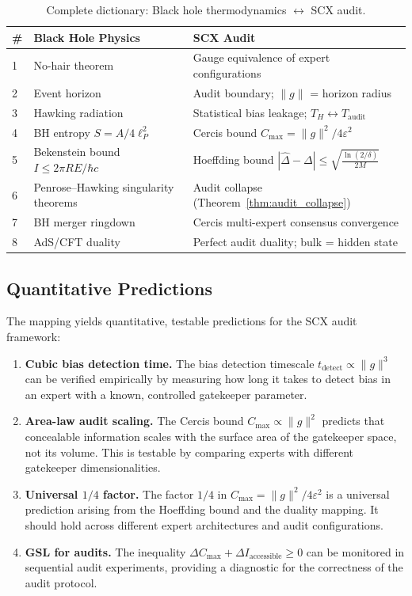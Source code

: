\documentclass[12pt,a4paper]{article}
\theoremstyle{remark}
\newcommand{\SCX}{\textsf{SCX}}
\newcommand{\Cercis}{\textsf{Cercis}}
\begin{document}
\begin{table}[H]
\centering
\caption{Complete dictionary: Black hole thermodynamics $\leftrightarrow$ SCX audit.}
\label{tab:mappings}
\begin{tabular}{@{}lll@{}}
\toprule
\textbf{\#} & \textbf{Black Hole Physics} & \textbf{SCX Audit} \\
\midrule
1 & No-hair theorem & Gauge equivalence of expert configurations \\
2 & Event horizon & Audit boundary; $\|g\|$ = horizon radius \\
3 & Hawking radiation & Statistical bias leakage; $T_H \leftrightarrow T_{\text{audit}}$ \\
4 & BH entropy $S = A/4\ell_P^2$ & Cercis bound $C_{\max} = \|g\|^2/4\varepsilon^2$ \\
5 & Bekenstein bound $I \leq 2\pi RE/\hbar c$ & Hoeffding bound $|\hat{\Delta} - \Delta| \leq \sqrt{\frac{\ln(2/\delta)}{2M}}$ \\
6 & Penrose--Hawking singularity theorems & Audit collapse (Theorem~\ref{thm:audit_collapse}) \\
7 & BH merger ringdown & \Cercis{} multi-expert consensus convergence \\
8 & AdS/CFT duality & Perfect audit duality; bulk = hidden state \\
\bottomrule
\end{tabular}
\end{table}

\subsection{Quantitative Predictions}

The mapping yields quantitative, testable predictions for the \SCX{} audit framework:

\begin{enumerate}[leftmargin=*, label=(\arabic*)]
  \item \textbf{Cubic bias detection time.} The bias detection timescale $t_{\text{detect}} \propto \|g\|^3$ can be verified empirically by measuring how long it takes to detect bias in an expert with a known, controlled gatekeeper parameter.
  \item \textbf{Area-law audit scaling.} The \Cercis{} bound $C_{\max} \propto \|g\|^2$ predicts that concealable information scales with the surface area of the gatekeeper space, not its volume. This is testable by comparing experts with different gatekeeper dimensionalities.
  \item \textbf{Universal $1/4$ factor.} The factor $1/4$ in $C_{\max} = \|g\|^2/4\varepsilon^2$ is a universal prediction arising from the Hoeffding bound and the duality mapping. It should hold across different expert architectures and audit configurations.
  \item \textbf{GSL for audits.} The inequality $\Delta C_{\max} + \Delta I_{\text{accessible}} \geq 0$ can be monitored in sequential audit experiments, providing a diagnostic for the correctness of the audit protocol.
\end{enumerate}
\end{document}
